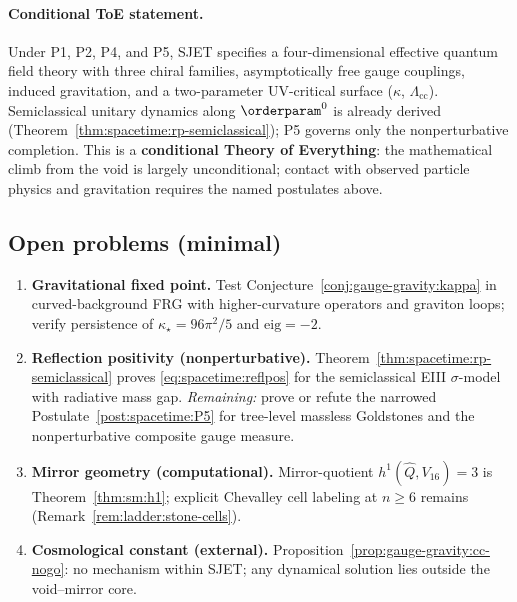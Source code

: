 \paragraph{Conditional ToE statement.}
Under P1, P2, P4, and P5, SJET specifies a four-dimensional effective
quantum field theory with three chiral families, asymptotically free gauge
couplings, induced gravitation, and a two-parameter UV-critical surface
($\kappa$, $\Lambda_{\mathrm{cc}}$). Semiclassical unitary dynamics along
$\orderparam^0$ is already derived
(Theorem~\ref{thm:spacetime:rp-semiclassical}); P5 governs only the
nonperturbative completion. This is a \textbf{conditional Theory of
Everything}: the mathematical climb from the void is largely unconditional;
contact with observed particle physics and gravitation requires the named
postulates above.

\subsection{Open problems (minimal)}
\label{sec:conclusions:open}

\begin{enumerate}[label=\textbf{O\arabic*.},leftmargin=*]
  \item \textbf{Gravitational fixed point.}
    Test Conjecture~\ref{conj:gauge-gravity:kappa} in curved-background FRG
    with higher-curvature operators and graviton loops; verify persistence
    of $\kappa_\star=96\pi^2/5$ and $\mathrm{eig}=-2$.
  \item \textbf{Reflection positivity (nonperturbative).}
    Theorem~\ref{thm:spacetime:rp-semiclassical} proves
    \eqref{eq:spacetime:reflpos} for the semiclassical EIII $\sigma$-model
    with radiative mass gap. \emph{Remaining:} prove or refute the narrowed
    Postulate~\ref{post:spacetime:P5} for tree-level massless Goldstones and
    the nonperturbative composite gauge measure.
  \item \textbf{Mirror geometry (computational).}
    Mirror-quotient $h^1(\hat Q,V_{16})=3$ is Theorem~\ref{thm:sm:h1}; explicit
    Chevalley cell labeling at $n\geq6$ remains
    (Remark~\ref{rem:ladder:stone-cells}).
  \item \textbf{Cosmological constant (external).}
    Proposition~\ref{prop:gauge-gravity:cc-nogo}: no mechanism within SJET;
    any dynamical solution lies outside the void--mirror core.
\end{enumerate}